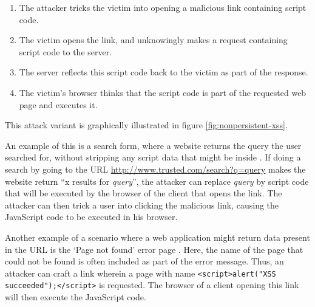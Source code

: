 \begin{enumerate}
	\item The attacker tricks the victim into opening a malicious link containing script code.
	\item The victim opens the link, and unknowingly makes a request containing script code to the server.
	\item The server reflects this script code back to the victim as part of the response.
	\item The victim's browser thinks that the script code is part of the requested web page and executes it.
\end{enumerate}

This attack variant is graphically illustrated in figure \ref{fig:nonpersistent-xss}.

An example of this is a search form, where a website returns the query the user searched for, without stripping any script data that might be inside \cite{Vogt2007}. If doing a search by going to the URL \url{http://www.trusted.com/search?q=query} makes the website return ``x results for \emph{query}'', the attacker can replace \emph{query} by script code that will be executed by the browser of the client that opens the link. The attacker can then trick a user into clicking the malicious link, causing the JavaScript code to be executed in his browser.

Another example of a scenario where a web application might return data present in the URL is the `Page not found' error page \cite{Kirda2006}. Here, the name of the page that could not be found is often included as part of the error message. Thus, an attacker can craft a link wherein a page with name \texttt{<script>alert("XSS succeeded");</script>} is requested. The browser of a client opening this link will then execute the JavaScript code.

